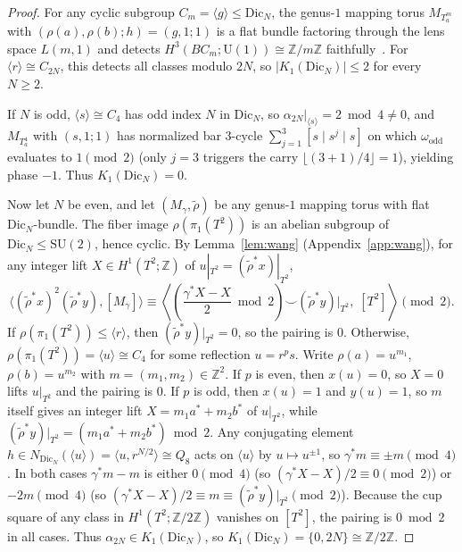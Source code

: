 \documentclass[11pt]{amsart}
\theoremstyle{definition}
\theoremstyle{remark}
\newcommand{\Z}{\mathbb{Z}}
\newcommand{\U}{\mathrm{U}}
\newcommand{\SU}{\mathrm{SU}}
\newcommand{\Dic}{\mathrm{Dic}}
\begin{document}
\begin{proof}
For any cyclic subgroup $C_m = \langle g\rangle \le \Dic_N$, the genus-$1$ mapping torus $M_{T_a^m}$ with $(\rho(a),\rho(b);h)=(g,1;1)$ is a flat bundle factoring through the lens space $L(m,1)$ and detects $H^3(BC_m;\U(1))\cong\Z/m\Z$ faithfully~\cite{Yu2022}.
For $\langle r\rangle \cong C_{2N}$, this detects all classes modulo $2N$, so $|K_1(\Dic_N)| \le 2$ for every $N \ge 2$.

If $N$ is odd, $\langle s\rangle \cong C_4$ has odd index $N$ in $\Dic_N$, so $\alpha_{2N}|_{\langle s\rangle} = 2\bmod 4 \neq 0$, and $M_{T_a^4}$ with $(s,1;1)$ has normalized bar $3$-cycle $\sum_{j=1}^3 [s\mid s^j\mid s]$ on which $\omega_{\mathrm{odd}}$ evaluates to $1\pmod 2$ (only $j=3$ triggers the carry $\lfloor(3+1)/4\rfloor=1$), yielding phase $-1$. Thus $K_1(\Dic_N)=0$.

Now let $N$ be even, and let $(M_\gamma,\tilde{\rho})$ be any genus-$1$ mapping torus with flat $\Dic_N$-bundle.
The fiber image $\rho(\pi_1(T^2))$ is an abelian subgroup of $\Dic_N \le \SU(2)$, hence cyclic.
By Lemma~\ref{lem:wang} (Appendix~\ref{app:wang}), for any integer lift $X\in H^1(T^2;\Z)$ of $u|_{T^2} = (\tilde{\rho}^*x)|_{T^2}$,
\[
    \langle (\tilde{\rho}^*x)^2 (\tilde{\rho}^*y), [M_\gamma] \rangle \equiv \left\langle \left(\frac{\gamma^* X - X}{2}\bmod 2\right) \smile (\tilde{\rho}^*y)|_{T^2},\; [T^2]\right\rangle \pmod 2.
\]
If $\rho(\pi_1(T^2)) \le \langle r\rangle$, then $(\tilde{\rho}^*y)|_{T^2} = 0$, so the pairing is $0$.
Otherwise, $\rho(\pi_1(T^2)) = \langle u\rangle \cong C_4$ for some reflection $u = r^p s$.
Write $\rho(a) = u^{m_1}$, $\rho(b) = u^{m_2}$ with $m = (m_1,m_2) \in \Z^2$.
If $p$ is even, then $x(u)=0$, so $X=0$ lifts $u|_{T^2}$ and the pairing is $0$.
If $p$ is odd, then $x(u)=1$ and $y(u)=1$, so $m$ itself gives an integer lift $X = m_1 a^* + m_2 b^*$ of $u|_{T^2}$, while $(\tilde{\rho}^*y)|_{T^2} = (m_1 a^* + m_2 b^*) \bmod 2$.
Any conjugating element $h \in N_{\Dic_N}(\langle u\rangle) = \langle u, r^{N/2}\rangle \cong Q_8$ acts on $\langle u\rangle$ by $u \mapsto u^{\pm 1}$, so $\gamma^* m \equiv \pm m \pmod 4$.
In both cases $\gamma^* m - m$ is either $0 \pmod 4$ (so $(\gamma^*X-X)/2 \equiv 0\pmod 2$) or $-2m \pmod 4$ (so $(\gamma^*X-X)/2 \equiv m \equiv (\tilde{\rho}^*y)|_{T^2} \pmod 2$).
Because the cup square of any class in $H^1(T^2;\Z/2\Z)$ vanishes on $[T^2]$, the pairing is $0 \bmod 2$ in all cases.
Thus $\alpha_{2N}\in K_1(\Dic_N)$, so $K_1(\Dic_N)=\{0,2N\}\cong\Z/2\Z$.
\end{proof}
\end{document}
